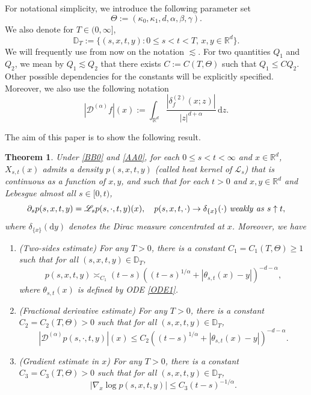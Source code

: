 \documentclass[11pt]{article}
\numberwithin{equation}{section}\providecommand{\asymp}{\mathrel{\sim}}
\newcommand{\rd}{\mathrm{d}}
\theoremstyle{plain}
\newtheorem{theorem}{Theorem}[section]
\theoremstyle{definition}
\let\p\partial
\newcommand\cD{{\mathcal D}}
\newcommand\mD{\mathbb{D}}
\newcommand\mR{\mathbb{R}}
\newcommand\1{{\mathbf{1}}}
\newcommand\sL{{\mathscr L}}
\begin{document}
For notational simplicity, we introduce the following parameter set
\begin{equation}\label{DEF_THETA}
\Theta:=(\kappa_0,\kappa_1,d,\alpha,\beta,\gamma).
\end{equation}
We also denote for $T\in(0,\infty]$,
\[
\mD_T:=\{(s,x,t,y): 0\leq s<t<T,\, x,y\in\mR^d\}.
\]
We will frequently use from now on the notation $\lesssim$. For two quantities $Q_1$ and $Q_2$, we mean by
$Q_1\lesssim Q_2 $ that there exists $C:=C(T,\Theta)$ such that $Q_1\le CQ_2 $. Other possible dependencies for the constants will be explicitly specified.
Moreover, we also use the following notation
\begin{equation}\label{DA0}
|\cD^{(\alpha)} f|(x):=\int_{\mR^d}\frac{|\delta^{(2)}_f(x;z)|}{|z|^{d+\alpha}}\,\rd z.
\end{equation}

The aim of this paper is to show the following result.
\begin{theorem}\label{Main}
Under \eqref{BB0} and \eqref{AA0}, for each $0\leq s<t<\infty$ and $x\in\mR^d$, $X_{s,t}(x)$ admits a density $p(s,x,t,y)$
(called heat kernel of $\sL_{s}$) that is continuous as a function of $x,y$, and such that for each $t>0$ and $x,y\in\mR^d$ and Lebesgue almost all $s\in[0,t)$,
\[
\p_s p(s,x,t,y)=\sL_{s}p(s,\cdot,t,y)(x),\quad p(s,x,t,\cdot)\rightarrow \delta_{\{x\}}(\cdot)\ {\rm \it weakly\ as}\ s\uparrow t,
\]
where $\delta_{\{x\}}(\rd y)$ denotes the Dirac measure concentrated at $x$.
Moreover, we have
\begin{enumerate}
\item (Two-sides estimate) For any $T>0$, there is a constant $C_1=C_1(T,\Theta)\ge 1$ such that for all $(s,x,t,y)\in\mD_T$,
\begin{equation}\label{TW}
p(s,x,t,y)\asymp_{C_1} (t-s)((t-s)^{1/\alpha}+|\theta_{s,t}(x)-y|)^{-d-\alpha},
\end{equation}
where $\theta_{s,t}(x)$ is defined by ODE \eqref{ODE1}.
\item (Fractional derivative estimate) For any $T>0$, there is a constant $C_2=C_2(T,\Theta)>0$ such that for all $(s,x,t,y)\in\mD_T$,
\begin{equation*}%
|\cD^{(\alpha)}p(s,\cdot,t,y)|(x) \le {C_2} ((t-s)^{1/\alpha}+|\theta_{s,t}(x)-y|)^{-d-\alpha}.
\end{equation*}
\item (Gradient estimate in $x$) For any $T>0$, there is a constant $C_3=C_3(T,\Theta)>0$ such that for all $(s,x,t,y)\in\mD_T$,
\begin{equation}\label{GR0}
|\nabla_x\log p(s,x,t,y)|\le {C_3} (t-s)^{-1/\alpha}.
\end{equation}
\end{enumerate}
\end{theorem}
\end{document}
